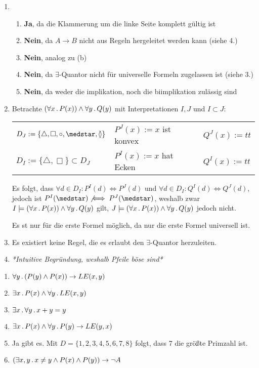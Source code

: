 \begin{enumerate}
	\item 
	
	\begin{enumerate}
		\item \textbf{Ja}, da die Klammerung um die linke Seite komplett gültig ist
		\item \textbf{Nein}, da $A \to B$ nicht aus Regeln hergeleitet werden kann (siehe 4.)
		\item \textbf{Nein}, analog zu (b)
		\item \textbf{Nein}, da $\exists$-Quantor nicht für universelle Formeln zugelassen ist (siehe 3.)
		\item \textbf{Nein}, da weder die implikation, noch die biimplikation zulässig sind
	\end{enumerate}	

	\item Betrachte $(\forall x \, . \, P(x))\land \forall y \, . \,Q(y)$ mit Interpretationen $I, J$ und $I \subset J$:
	
	\begin{center}
		\begin{tabular}{l l l}
			$D_J := \{\triangle, \Box, \circ, \medstar, \between\}$ & $P^J(x) := x$ ist konvex & $Q^J(x) := tt$ \\
			$D_I := \{\triangle, \Box\} \subset D_J$ 		   & $P^I(x) := x$ hat Ecken & $Q^I(x) := tt$\\
		\end{tabular}
	\end{center}
	
	Es folgt, dass $\forall d \in D_I : P^I(d) \iff P^J(d)$ und $\forall d \in D_I : Q^I(d) \iff Q^J(d)$, jedoch ist $P^I(\medstar) \not\iff P^J(\medstar)$, weshalb zwar $I\models (\forall x \, . \, P(x))\land \forall y \, . \,Q(y)$ gilt, $J \models (\forall x \, . \, P(x))\land \forall y \, . \,Q(y)$ jedoch nicht.
	
	\bigskip Es st nur für die erste Formel möglich, da nur die erste Formel universell ist.
	
	\item Es existiert keine Regel, die es erlaubt den $\exists$-Quantor herzuleiten.

	\item \textit{*Intuitive Begründung, weshalb Pfeile böse sind*}

\end{enumerate}



\begin{enumerate}
	\item $\forall y \, . \, (P(y) \land P(x)) \to LE(x,y)  $
	\item $\exists x \, . \, P(x) \land \forall y \, . \, LE(x,y) $
	\item $\exists x \, . \, \forall y \, . \, x+y=y$
	\item $\exists x \, . \, P(x) \land \forall y \, . \, P(y) \to LE(y,x)$
	\item Ja gibt es. Mit $D=\{1,2,3,4,5,6,7,8\}$ folgt, dass 7 die größte Primzahl ist.
	\item $(\exists x,y \, . \, x \not = y \land P(x) \land P(y)) \to \lnot A$
\end{enumerate}

\smiley

